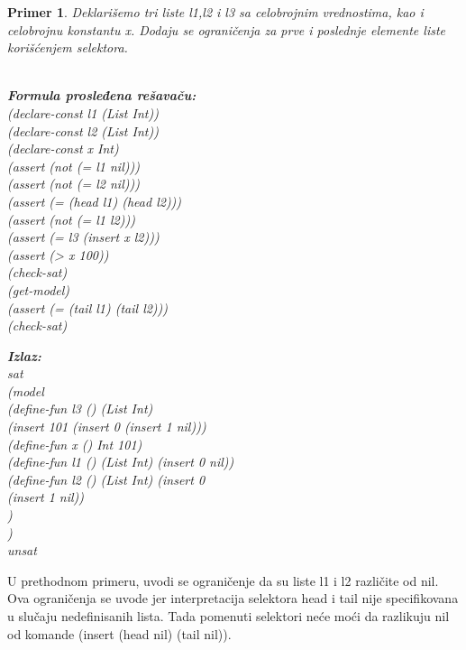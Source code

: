 \documentclass[12pt,oneside]{memoir}
\newcommand\tab[1][0.5cm]{\hspace*{#1}}
\newtheorem{primer}{Primer}
\begin{document}
\begin{primer} Deklarišemo tri liste l1,l2 i l3 sa celobrojnim vrednostima, kao i celobrojnu konstantu x. Dodaju se ograničenja za prve i poslednje elemente liste korišćenjem selektora. 
\\ \\
\begin{minipage}[b]{0.42\textwidth}
\textbf{Formula prosleđena rešavaču:}
\\(declare-const l1 (List Int))
\\(declare-const l2 (List Int))
\\(declare-const x Int)
\\(assert (not (= l1 nil)))
\\(assert (not (= l2 nil)))
\\(assert (= (head l1) (head l2)))
\\(assert (not (= l1 l2)))
\\(assert (= l3 (insert x l2)))
\\(assert (> x 100))
\\(check-sat)
\\(get-model)
\\(assert (= (tail l1) (tail l2)))
\\(check-sat)
\end{minipage}
\hspace{0.4cm}
\begin{minipage}[t]{0.55\textwidth}
\vspace{-8.5cm}
\textbf{Izlaz:}
\\sat 
\\(model 
\\\tab(define-fun l3 () (List Int) 
\\\tab(insert 101 (insert 0 (insert 1 nil)))
\\\tab(define-fun x () Int 101) 
\\\tab(define-fun l1 () (List Int) (insert 0 nil)) 
\\\tab(define-fun l2 () (List Int) (insert 0 
\\\tab\tab(insert 1 nil))
\\\tab)
\\) 
\\unsat
\end{minipage}


\end{primer}

U prethodnom primeru, uvodi se ograničenje da su liste l1 i l2 različite od nil. Ova ograničenja se uvode jer interpretacija selektora head i tail 
nije specifikovana u slučaju nedefinisanih lista.
Tada pomenuti selektori neće moći da razlikuju nil od komande (insert (head nil) (tail nil)).
\end{document}
